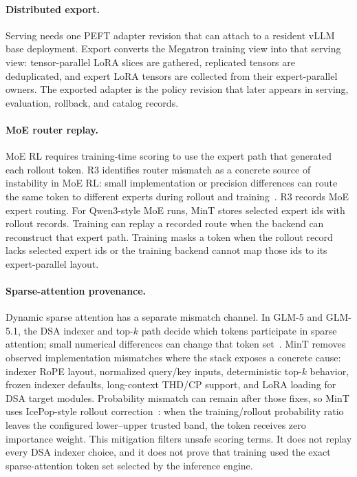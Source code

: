 \paragraph{Distributed export.}
Serving needs one PEFT adapter revision that can attach to a resident vLLM base deployment. Export converts the Megatron training view into that serving view: tensor-parallel LoRA slices are gathered, replicated tensors are deduplicated, and expert LoRA tensors are collected from their expert-parallel owners. The exported adapter is the policy revision that later appears in serving, evaluation, rollback, and catalog records.

\paragraph{MoE router replay.}
MoE RL requires training-time scoring to use the expert path that generated each rollout token. R3 identifies router mismatch as a concrete source of instability in MoE RL: small implementation or precision differences can route the same token to different experts during rollout and training~\citep{r3_moe_router2025,chiang2026routerreplay}. R3 records MoE expert routing. For Qwen3-style MoE runs, MinT stores selected expert ids with rollout records. Training can replay a recorded route when the backend can reconstruct that expert path. Training masks a token when the rollout record lacks selected expert ids or the training backend cannot map those ids to its expert-parallel layout.

\paragraph{Sparse-attention provenance.}
Dynamic sparse attention has a separate mismatch channel. In GLM-5 and GLM-5.1, the DSA indexer and top-$k$ path decide which tokens participate in sparse attention; small numerical differences can change that token set~\citep{glm5_2026,stevenchiang2026supportglm5inmint}. MinT removes observed implementation mismatches where the stack exposes a concrete cause: indexer RoPE layout, normalized query/key inputs, deterministic top-$k$ behavior, frozen indexer defaults, long-context THD/CP support, and LoRA loading for DSA target modules. Probability mismatch can remain after those fixes, so MinT uses IcePop-style rollout correction~\citep{ling_every_step2025}: when the training/rollout probability ratio leaves the configured lower--upper trusted band, the token receives zero importance weight. This mitigation filters unsafe scoring terms. It does not replay every DSA indexer choice, and it does not prove that training used the exact sparse-attention token set selected by the inference engine.

